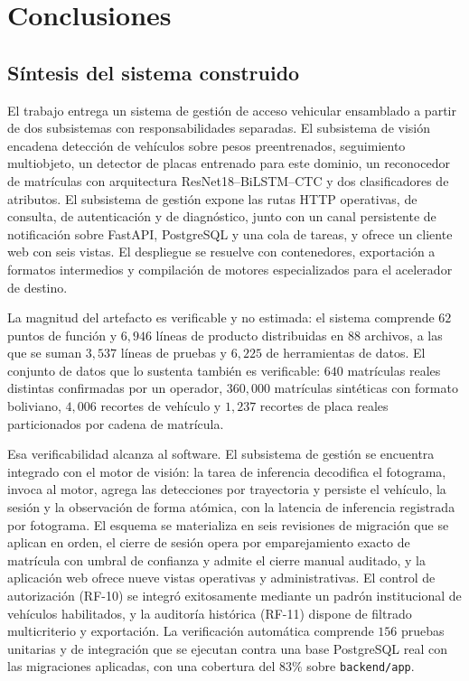 \section{Conclusiones}

\subsection{Síntesis del sistema construido}

El trabajo entrega un sistema de gestión de acceso vehicular ensamblado a partir
de dos subsistemas con responsabilidades separadas. El subsistema de visión
encadena detección de vehículos sobre pesos preentrenados, seguimiento
multiobjeto, un detector de placas entrenado para este dominio, un reconocedor de
matrículas con arquitectura ResNet18--BiLSTM--CTC y dos clasificadores de
atributos. El subsistema de gestión expone las rutas HTTP operativas, de consulta,
de autenticación y de diagnóstico, junto con un canal persistente de notificación
sobre FastAPI, PostgreSQL y una cola de tareas, y ofrece un cliente web con seis
vistas. El despliegue se resuelve con contenedores,
exportación a formatos intermedios y compilación de motores especializados para el
acelerador de destino.

La magnitud del artefacto es verificable y no estimada: el sistema comprende $62$
puntos de función y $6{,}946$ líneas de producto distribuidas en $88$ archivos, a
las que se suman $3{,}537$ líneas de pruebas y $6{,}225$ de herramientas de datos. El
conjunto de datos que lo sustenta también es verificable: $640$ matrículas reales
distintas confirmadas por un operador, $360{,}000$ matrículas sintéticas con formato
boliviano, $4{,}006$ recortes de vehículo y $1{,}237$ recortes de placa reales
particionados por cadena de matrícula.

Esa verificabilidad alcanza al software. El subsistema de gestión se encuentra
integrado con el motor de visión: la tarea de inferencia decodifica el fotograma,
invoca al motor, agrega las detecciones por trayectoria y persiste el vehículo, la
sesión y la observación de forma atómica, con la latencia de inferencia registrada
por fotograma. El esquema se materializa en seis revisiones de migración que se
aplican en orden, el cierre de sesión opera por emparejamiento exacto de matrícula
con umbral de confianza y admite el cierre manual auditado, y la aplicación web
ofrece nueve vistas operativas y administrativas. El control de autorización
(RF-10) se integró exitosamente mediante un padrón institucional de vehículos
habilitados, y la auditoría histórica (RF-11) dispone de filtrado multicriterio y
exportación. La verificación automática comprende $156$ pruebas unitarias y de
integración que se ejecutan contra una base PostgreSQL real con las migraciones
aplicadas, con una cobertura del $83\%$ sobre \texttt{backend/app}.

